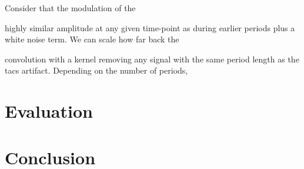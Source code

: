 \documentclass[a4paper]{article}
\begin{document}
Consider that the modulation of the

highly similar  amplitude at any given time-point as during earlier periods plus a white noise term. We can scale how far back the

convolution with a kernel removing any signal with the same period length as the \gls{tacs} artifact. Depending on the number of periods,

\section{Evaluation}

\section{Conclusion}




\end{document}
